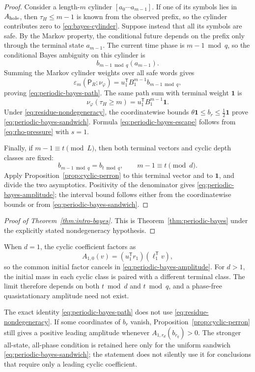 \begin{proof}
Consider a length-\(m\) cylinder \([a_0\cdots a_{m-1}]\).  If one of
its symbols lies in \(A_{\rm hole}\), then \(\tau_H\leq m-1\) is known
from the observed prefix, so the cylinder contributes zero to
\eqref{eq:bayes-cylinder}.  Suppose instead that all its symbols are
safe.  By the Markov property, the conditional future depends on the
prefix only through the terminal state \(a_{m-1}\).  The current time
phase is \(m-1\bmod q\), so the conditional Bayes ambiguity on this
cylinder is
\[
  b_{m-1\bmod q}(a_{m-1}).
\]
Summing the Markov cylinder weights over all safe words gives
\[
  \varepsilon_m(\mathsf P_R;\nu_\varphi)
  =u_1^{\mathsf T}B_1^{m-1}b_{m-1\bmod q},
\]
proving \eqref{eq:periodic-bayes-path}.  The same path sum with terminal
weight \(\mathbf1\) is
\[
  \nu_\varphi(\tau_H\geq m)
  =u_1^{\mathsf T}B_1^{m-1}\mathbf1.
\]
Under \eqref{eq:residue-nondegeneracy}, the coordinatewise bounds
\(\theta\mathbf1\leq b_r\leq\tfrac12\mathbf1\) prove
\eqref{eq:periodic-bayes-sandwich}.  Formula
\eqref{eq:periodic-bayes-escape} follows from
\eqref{eq:rho-pressure} with \(s=1\).

Finally, if \(m-1\equiv t\pmod L\), then both terminal vectors and
cyclic depth classes are fixed:
\[
  b_{m-1\bmod q}=b_{t\bmod q},
  \qquad
  m-1\equiv t\pmod d.
\]
Apply Proposition~\ref{prop:cyclic-perron} to this terminal vector and
to \(\mathbf1\), and divide the two asymptotics.  Positivity of the
denominator gives \eqref{eq:periodic-bayes-amplitude}; the interval bound
follows either from the coordinatewise bounds or from
\eqref{eq:periodic-bayes-sandwich}.
\end{proof}

\begin{proof}[Proof of Theorem~\ref{thm:intro-bayes}]
This is Theorem~\ref{thm:periodic-bayes} under the explicitly stated
nondegeneracy hypothesis.
\end{proof}

\begin{remark}
When \(d=1\), the cyclic coefficient factors as
\[
  A_{1,0}(v)
  =(u_1^{\mathsf T}r_1)(\ell_1^{\mathsf T}v),
\]
so the common initial factor cancels in
\eqref{eq:periodic-bayes-amplitude}.  For \(d>1\), the initial mass in
each cyclic class is paired with a different terminal class.  The limit
therefore depends on both \(t\bmod d\) and \(t\bmod q\), and a
phase-free quasistationary amplitude need not exist.
\end{remark}

\begin{remark}
The exact identity \eqref{eq:periodic-bayes-path} does not use
\eqref{eq:residue-nondegeneracy}.  If some coordinates of \(b_r\)
vanish, Proposition~\ref{prop:cyclic-perron} still gives a positive
leading amplitude whenever
\(A_{1,r_d}(b_{r_q})>0\).  The stronger all-state, all-phase condition is
retained here only for the uniform sandwich
\eqref{eq:periodic-bayes-sandwich}; the statement does not silently use
it for conclusions that require only a leading cyclic coefficient.
\end{remark}
